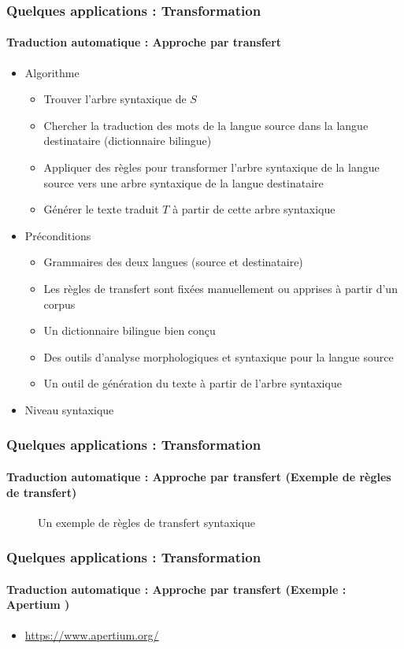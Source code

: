 \documentclass[xcolor=table]{beamer}
\begin{document}
\begin{frame}
	\frametitle{Quelques applications : Transformation}
	\framesubtitle{Traduction automatique : Approche par transfert}
	\begin{itemize}
		\item Algorithme
		\begin{itemize}
			\item Trouver l'arbre syntaxique de $S$
			\item Chercher la traduction des mots de la langue source dans la langue destinataire (dictionnaire bilingue)
			\item Appliquer des règles pour transformer l'arbre syntaxique de la langue source vers une arbre syntaxique de la langue destinataire
			\item Générer le texte traduit $T$ à partir de cette arbre syntaxique
		\end{itemize}
		\item Préconditions 
		\begin{itemize}
			\item Grammaires des deux langues (source et destinataire)
			\item Les règles de transfert sont fixées manuellement ou apprises à partir d'un corpus
			\item Un dictionnaire bilingue bien conçu
			\item Des outils d'analyse morphologiques et syntaxique pour la langue source
			\item Un outil de génération du texte à partir de l'arbre syntaxique
		\end{itemize}
		\item Niveau syntaxique 
	\end{itemize}
\end{frame}

\begin{frame}
	\frametitle{Quelques applications : Transformation}
	\framesubtitle{Traduction automatique : Approche par transfert (Exemple de règles de transfert)}
	
	\begin{figure}
		\centering
		\caption{Un exemple de règles de transfert syntaxique \cite{06-quah}}
	\end{figure}
\end{frame}

\begin{frame}
	\frametitle{Quelques applications : Transformation}
	\framesubtitle{Traduction automatique : Approche par transfert (Exemple : Apertium \cite{11-forcada-al})}
	
	\begin{itemize}
		\item \url{https://www.apertium.org/}
	\end{itemize}

\end{frame}
\end{document}
